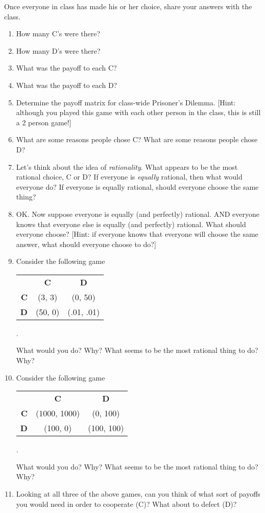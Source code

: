 Once everyone in class has made his or her choice, share your answers with the class.
\begin{enumerate}

\item How many C's were there?
\item How many D's were there?
\item What was the payoff to each C?
\item What was the payoff to each D?
\item Determine the payoff matrix for class-wide Prisoner's Dilemma. [Hint: although you played this game with each other person in the class, this is still a 2 person game!]

\item What are some reasons people chose C? What are some reasons people chose D? 

\item Let's think about the idea of {\it rationality}. What appears to be the most rational choice, C or D? If everyone is {\it equally} rational, then what would everyone do? If everyone is equally rational, should everyone choose the same thing?

\item OK. Now suppose everyone is equally (and perfectly) rational. AND everyone knows that everyone else is equally (and perfectly) rational. What should everyone choose? [Hint: if everyone knows that everyone will choose the same answer, what should everyone choose to do?]

\item Consider the following game 
\begin{tabular}{rcc}
&\textbf{C}&\textbf{D}\\ 
\textbf{C} &(3, 3)&(0, 50) \\ 
\textbf{D}&(50, 0)&(.01, .01) \\ 
\end{tabular}.

What would you do? Why? What seems to be the most rational thing to do? Why?

\item Consider the following game 
\begin{tabular}{rcc}
&\textbf{C}&\textbf{D}\\ 
\textbf{C} &(1000, 1000)&(0, 100) \\ 
\textbf{D}&(100, 0)&(100, 100) \\ 
\end{tabular}.

What would you do? Why? What seems to be the most rational thing to do? Why?

\item Looking at all three of the above games, can you think of what sort of payoffs you would need in order to cooperate (C)? What about to defect (D)?
\end{enumerate}
